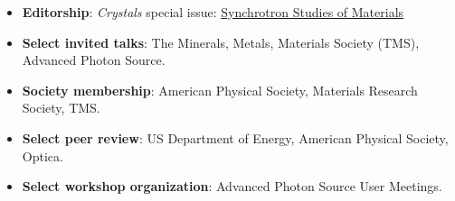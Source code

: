 \begin{itemize}
    \item \textbf{Editorship}: \emph{Crystals} special issue: \href{https://web.archive.org/web/20210930195051/https://www.mdpi.com/journal/crystals/special_issues/Synchrotron_Studies}{Synchrotron Studies of Materials} 
    \item \textbf{Select invited talks}: The Minerals, Metals, Materials Society (TMS), Advanced Photon Source. 
    \item \textbf{Society membership}: American Physical Society, Materials Research Society, TMS.
    \item \textbf{Select peer review}: US Department of Energy, American Physical Society, Optica.
    \item \textbf{Select workshop organization}: Advanced Photon Source User Meetings.
\end{itemize}